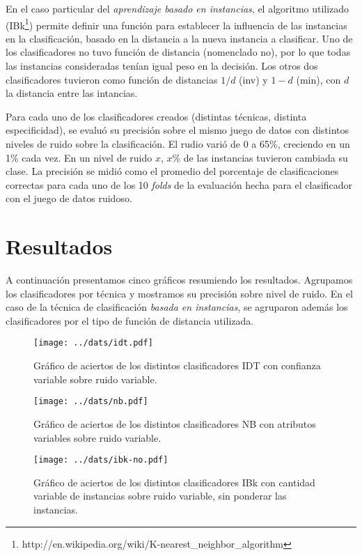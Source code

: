 \documentclass[a4paper,10pt]{article}
\begin{document}
En el caso particular del \emph{aprendizaje basado en instancias}, el algoritmo utilizado (\textsf{IBk}\footnote{http://en.wikipedia.org/wiki/K-nearest\_neighbor\_algorithm}) permite definir una función para establecer la influencia de las instancias en la clasificación, basado en la distancia a la nueva instancia a clasificar. Uno de los clasificadores no tuvo función de distancia (nomenclado \textsf{no}), por lo que todas las instancias consideradas tenían igual peso en la decisión. Los otros dos clasificadores tuvieron como función de distancias $1/d$ (\textsf{inv}) y $1-d$ (\textsf{min}), con $d$ la distancia entre las intancias. 

Para cada uno de los clasificadores creados (distintas técnicas, distinta especificidad), se evaluó su precisión sobre el mismo juego de datos con distintos niveles de ruido sobre la clasificación. El rudio varió de 0 a 65\%, creciendo en un 1\% cada vez. En un nivel de ruido $x$, $x$\% de las instancias tuvieron cambiada su clase. La precisión se midió como el promedio del porcentaje de clasificaciones correctas para cada uno de los 10 \emph{folds} de la evaluación hecha para el clasificador con el juego de datos ruidoso.

\section{Resultados}

A continuación presentamos cinco gráficos resumiendo los resultados. Agrupamos los clasificadores por técnica y mostramos su precisión sobre nivel de ruido. En el caso de la técnica de clasificación \emph{basada en instancias}, se agruparon además los clasificadores por el tipo de función de distancia utilizada. 

\begin{figure}[h]
\centering
\texttt{[image: ../dats/idt.pdf]}
\caption{Gráfico de aciertos de los distintos clasificadores \textsf{IDT} con confianza variable sobre ruido variable.}\label{fig:idt}
\end{figure}

\begin{figure}[h]
\centering
\texttt{[image: ../dats/nb.pdf]}
\caption{Gráfico de aciertos de los distintos clasificadores \textsf{NB} con atributos variables sobre ruido variable.}\label{fig:nb}
\end{figure}

\begin{figure}[h]
\centering
\texttt{[image: ../dats/ibk-no.pdf]}
\caption{Gráfico de aciertos de los distintos clasificadores \textsf{IBk} con cantidad variable de instancias sobre ruido variable, sin ponderar las instancias.}\label{fig:ibk-no}
\end{figure}
\end{document}
